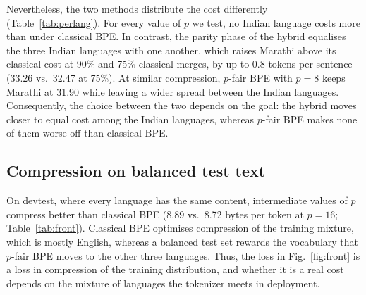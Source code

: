 Nevertheless, the two methods distribute the cost differently (Table~\ref{tab:perlang}).
For every value of $p$ we test, no Indian language costs more than under classical BPE.
In contrast, the parity phase of the hybrid equalises the three Indian languages with one
another, which raises Marathi above its classical cost at 90\% and 75\% classical merges,
by up to 0.8 tokens per sentence (33.26 vs.\ 32.47 at 75\%). At similar compression, $p$-fair BPE
with $p=8$ keeps Marathi at 31.90 while leaving a wider spread between the Indian languages.
Consequently, the choice between the two depends on the goal: the hybrid moves closer to
equal cost among the Indian languages, whereas $p$-fair BPE makes none of them worse off
than classical BPE.

\subsection{Compression on balanced test text}

On devtest, where every language has the same content, intermediate values of $p$ compress
better than classical BPE (8.89 vs.\ 8.72 bytes per token at $p=16$; Table~\ref{tab:front}).
Classical BPE optimises compression of the training mixture, which is mostly English,
whereas a balanced test set rewards the vocabulary that $p$-fair BPE moves to the other
three languages. Thus, the loss in Fig.~\ref{fig:front} is a loss in compression of the
training distribution, and whether it is a real cost depends on the mixture of languages the
tokenizer meets in deployment.